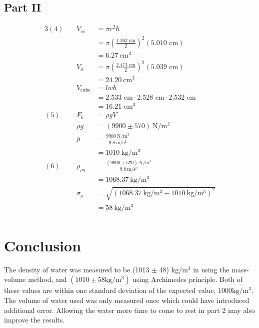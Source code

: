 \documentclass[12pt]{article}
\begin{document}
        \subsection*{Part II}
        \begin{alignat*}{3}
            (4)~&&
            V_{sc} &= \pi r^2h\\
            &&&=\pi\left(\frac{1.262\text{ cm}}{2}\right)^2(5.010\text{ cm})\\
            &&& = 6.27\mathrm{~cm^3}\\
            &&V_{lc} &= \pi\left(\frac{2.473\text{ cm}}{2}\right)^2(5.039\text{ cm})\\
            &&&=24.20\mathrm{~cm^3}\\
            &&V_\text{cube} &= lwh\\
            &&& = 2.533\text{ cm} \cdot 2.528\text{ cm} \cdot 2.532\text{ cm}\\
            &&& = 16.21\text{ cm}^3\\
            (5)~&&
            F_b&=\rho gV\\
            &&\rho g &= (9900 \pm 570)\mathrm{~N/m^3}\\
            && \overline{\rho} &= \frac{9900\mathrm{~N/m^3}}{9.8\mathrm{~m/s^2}}\\
            &&&=1010 \mathrm{~kg/m^3}\\
            (6)~&&
            \rho_{\rho g} &= \frac{(9900 + 570)\mathrm{~N/m^3}}{9.8\mathrm{~m/s^2}}\\
            &&&= 1068.37\mathrm{~kg/m^3}\\
            &&\sigma_\rho &= \sqrt{(1068.37\mathrm{~kg/m^3}-1010 \mathrm{~kg/m^3})^2}\\
            &&&= 58 \mathrm{~kg/m^3}\\
        \end{alignat*}
    \section{Conclusion}
        The density of water was measured to be (1013 \(\pm\) 48) \(\mathrm{kg/m^3}\) in using the mass-volume method, and \((1010 \pm 58 \mathrm{kg/m^3})\) using Archimedes principle. Both of these values are within one standard deviation of the expected value, \(1000 \mathrm{kg/m^3}\). The volume of water used was only measured once which could have introduced additional error. Allowing the water more time to come to rest in part 2 may also improve the results.
\end{document}
